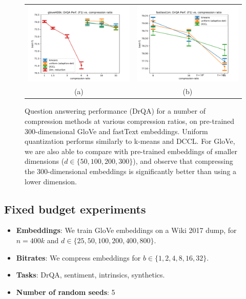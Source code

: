 \begin{figure}
	\centering
	\begin{small}
		\begin{tabular}{@{\hskip -0.0in}c@{\hskip -0.0in}c@{\hskip -0.0in}}
			\includegraphics[width=0.45\linewidth]{figures/glove400k_drqa_vs_compression.pdf} &
			\includegraphics[width=0.45\linewidth]{figures/fasttext1m_drqa_vs_compression.pdf} \\
			\;\;\;\;\;(a) & \;\;\;\;\;\;(b) 
		\end{tabular}
	\end{small}
\caption{Question answering performance (DrQA) for a number of compression methods at various compression ratios, on pre-trained 300-dimensional GloVe and fastText embeddings.  Uniform quantization performs similarly to k-means and DCCL.  For GloVe, we are also able to compare with pre-trained embeddings of smaller dimensions ($d\in\{50,100,200,300\}$), and observe that compressing the 300-dimensional embeddings is significantly better than using a lower dimension.}
\label{fig:glove400k_drqa}
\end{figure}



\subsection{Fixed budget experiments}
\begin{itemize}
	\item \textbf{Embeddings}: We train GloVe embeddings on a Wiki 2017 dump, for $n=400k$ and $d \in \{25,50,100,200,400,800\}$.
	\item \textbf{Bitrates}: We compress embeddings for $b \in \{1,2,4,8,16,32\}$.
	\item \textbf{Tasks}: DrQA, sentiment, intrinsics, synthetics.
	\item \textbf{Number of random seeds}: 5
\end{itemize}


